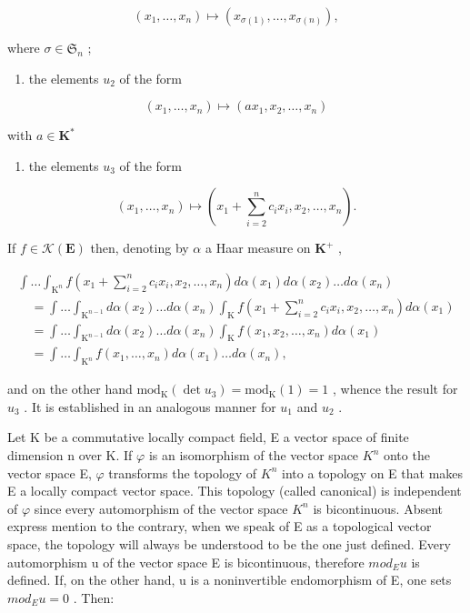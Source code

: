 \[
\left(x _ {1}, \dots , x _ {n}\right) \mapsto \left(x _ {\sigma (1)}, \dots , x _ {\sigma (n)}\right),
\]

where \(\sigma \in \mathfrak{S}_n\) ;

\begin{enumerate}
\def\labelenumi{(\alph{enumi})}
\setcounter{enumi}{1}
\tightlist
\item
  the elements \(u_{2}\) of the form
\end{enumerate}

\[
\left(x _ {1}, \dots , x _ {n}\right) \mapsto \left(a x _ {1}, x _ {2}, \dots , x _ {n}\right)
\]

with \(a\in \mathbf{K}^*\)

\begin{enumerate}
\def\labelenumi{(\alph{enumi})}
\setcounter{enumi}{2}
\tightlist
\item
  the elements \(u_{3}\) of the form
\end{enumerate}

\[
\left(x _ {1}, \dots , x _ {n}\right) \mapsto \left(x _ {1} + \sum_ {i = 2} ^ {n} c _ {i} x _ {i}, x _ {2}, \dots , x _ {n}\right).
\]

If \(f \in \mathcal{K}(\mathbf{E})\) then, denoting by \(\alpha\) a Haar measure on \(\mathbf{K}^+\) ,

\[
\begin{array}{l} \int \dots \int_ {\mathrm{K} ^ {n}} f (x _ {1} + \sum_ {i = 2} ^ {n} c _ {i} x _ {i}, x _ {2}, \ldots , x _ {n}) d \alpha (x _ {1}) d \alpha (x _ {2}) \ldots d \alpha (x _ {n}) \\ \quad = \int \dots \int_ {\mathrm{K} ^ {n - 1}} d \alpha (x _ {2}) \ldots d \alpha (x _ {n}) \int_ {\mathrm{K}} f (x _ {1} + \sum_ {i = 2} ^ {n} c _ {i} x _ {i}, x _ {2}, \ldots , x _ {n}) d \alpha (x _ {1}) \\ \quad = \int \dots \int_ {\mathrm{K} ^ {n - 1}} d \alpha (x _ {2}) \ldots d \alpha (x _ {n}) \int_ {\mathrm{K}} f (x _ {1}, x _ {2}, \ldots , x _ {n}) d \alpha (x _ {1}) \\ \quad = \int \dots \int_ {\mathrm{K} ^ {n}} f (x _ {1}, \ldots , x _ {n}) d \alpha (x _ {1}) \ldots d \alpha (x _ {n}), \end{array}
\]

and on the other hand \(\mathrm{mod}_{\mathrm{K}}(\det u_{3})=\mathrm{mod}_{\mathrm{K}}(1)=1\) , whence the result for \(u_{3}\) . It is established in an analogous manner for \(u_{1}\) and \(u_{2}\) .

Let K be a commutative locally compact field, E a vector space of finite dimension n over K. If \(\varphi\) is an isomorphism of the vector space \(K^{n}\) onto the vector space E, \(\varphi\) transforms the topology of \(K^{n}\) into a topology on E that makes E a locally compact vector space. This topology (called canonical) is independent of \(\varphi\) since every automorphism of the vector space \(K^{n}\) is bicontinuous. Absent express mention to the contrary, when we speak of E as a topological vector space, the topology will always be understood to be the one just defined. Every automorphism u of the vector space E is bicontinuous, therefore \(mod_{E}u\) is defined. If, on the other hand, u is a noninvertible endomorphism of E, one sets \(mod_{E}u = 0\) . Then:

